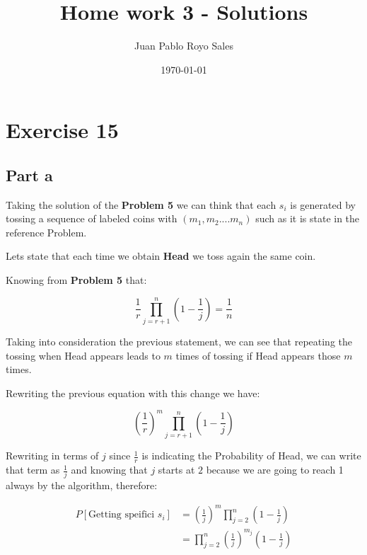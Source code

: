 \documentclass[12pt, a4paper]{article}
\title{Home work 3 - Solutions}
\author{Juan Pablo Royo Sales}
\date\today
\begin{document}
\begin{titlingpage}
  \maketitle
\end{titlingpage}

\section{Exercise 15}
\subsection{Part a}

Taking the solution of the \textbf{Problem 5} we can think that each $s_i$ is
generated by tossing a sequence of labeled coins with $(m_1,m_2....m_n)$ such as
it is state in the reference Problem.

Lets state that each time we obtain \textbf{Head} we toss again the same coin.

Knowing from \textbf{Problem 5} that:

\begin{equation}
  \frac{1}{r}\prod_{j=r+1}^{n} (1 - \frac{1}{j}) = \frac{1}{n}
\end{equation}

Taking into consideration the previous statement, we can see that repeating the
tossing when Head appears leads to $m$ times of tossing if Head appears those
$m$ times.

Rewriting the previous equation with this change we have:

\begin{equation}
  \left(\frac{1}{r}\right)^m\prod_{j=r+1}^{n} (1 - \frac{1}{j}) 
\end{equation}

Rewriting in terms of $j$ since $\frac{1}{r}$ is indicating the Probability of
Head, we can write that term as $\frac{1}{j}$ and knowing that $j$ starts at $2$
because we are going to reach 1 always by the algorithm, therefore:

\begin{subequations}
  \begin{align}
    P[\text{Getting speifici }s_i] &= \left(\frac{1}{j}\right)^m\prod_{j=2}^{n} (1 - \frac{1}{j}) \\
                                   &= \prod_{j=2}^{n} \left(\frac{1}{j}\right)^{m_j} (1 - \frac{1}{j}) 
  \end{align}
\end{subequations}
\end{document}
